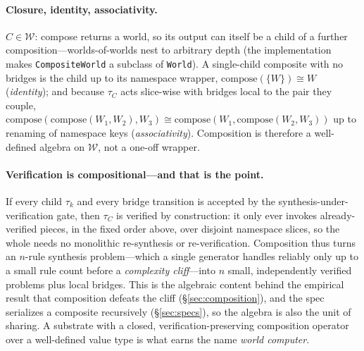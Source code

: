 \documentclass[11pt]{article}
\begin{document}
\paragraph{Closure, identity, associativity.} $C\in\mathcal{W}$: \textrm{compose} returns a world,
so its output can itself be a child of a further composition---worlds-of-worlds nest to arbitrary
depth (the implementation makes \texttt{CompositeWorld} a subclass of \texttt{World}). A single-child
composite with no bridges is the child up to its namespace wrapper, $\mathrm{compose}(\{W\})\cong W$
(\emph{identity}); and because $\tau_C$ acts slice-wise with bridges local to the pair they couple,
$\mathrm{compose}(\mathrm{compose}(W_1,W_2),W_3)\cong\mathrm{compose}(W_1,\mathrm{compose}(W_2,W_3))$
up to renaming of namespace keys (\emph{associativity}). Composition is therefore a well-defined
algebra on $\mathcal{W}$, not a one-off wrapper.

\paragraph{Verification is compositional---and that is the point.} If every child $\tau_k$ and every
bridge transition is accepted by the synthesis-under-verification gate, then $\tau_C$ is verified
by construction: it only ever invokes already-verified pieces, in the fixed order above, over
disjoint namespace slices, so the whole needs no monolithic re-synthesis or re-verification.
Composition thus turns an $n$-rule synthesis problem---which a single generator handles reliably
only up to a small rule count before a \emph{complexity cliff}---into $n$ small, independently
verified problems plus local bridges. This is the algebraic content behind the empirical result that
composition defeats the cliff (\S\ref{sec:composition}), and the spec serializes a composite
recursively (\S\ref{sec:specs}), so the algebra is also the unit of sharing. A substrate with a
closed, verification-preserving composition operator over a well-defined value type is what earns
the name \emph{world computer}.
\end{document}

